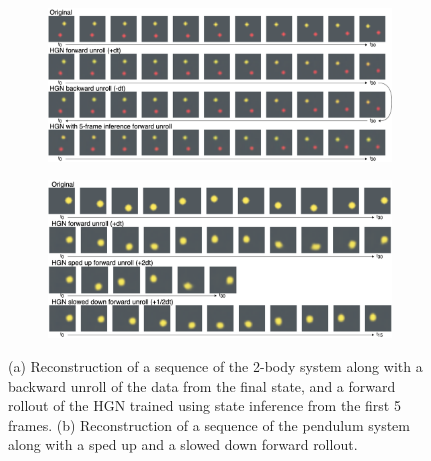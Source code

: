 \begin{figure}
    \centering
    \begin{subfigure}{.48\textwidth}
        \centering
        \includegraphics[width=.9\linewidth]{pictures/rollout_samples/new_forward_unroll_2_body.png}
        \label{fig:rollout-3-body}
        \caption{}
    \end{subfigure}
    \begin{subfigure}{.48\textwidth}
        \centering
        \includegraphics[width=.9\linewidth]{pictures/rollout_samples/new_forward_backward_unroll_pendulum.png}
        \caption{}
        \label{fig:rollout-pendulum}
    \end{subfigure}
    \caption{(a) Reconstruction of a sequence of the 2-body system along with a backward unroll of the data from the final state, and a forward rollout of the HGN trained using state inference from the first 5 frames. (b) Reconstruction of a sequence of the pendulum system along with a sped up and a slowed down forward rollout.}
    \label{fig:rollout_back_forth}
\end{figure}

